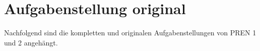 \section{Aufgabenstellung original}
Nachfolgend sind die kompletten und originalen Aufgabenstellungen von PREN 1 und 2 angehängt.





